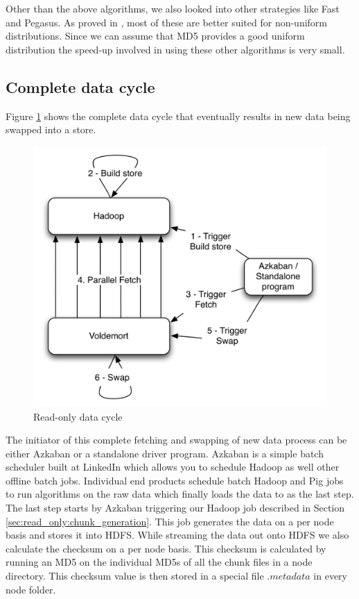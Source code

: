 \documentclass[10pt,twocolumn,preprint,nonatbib,numbers]{sigplanconf}
\begin{document}
Other than the above algorithms, we also looked into other strategies like Fast and Pegasus. As proved in \cite{manolopoulos}, most of these are better suited for non-uniform distributions. Since we can assume that MD5 provides a good uniform distribution the speed-up involved in using these other algorithms is very small. 


\subsection{Complete data cycle}
\label{sec:read_only:data_cycle}

Figure \ref{cycle} shows the complete data cycle that eventually results in new data being swapped into a \projectname{} store. 

\begin{figure}
  \centering
    \includegraphics[scale=0.60]{images/cycle.png}
  \caption{Read-only data cycle}
  \label{cycle}
\end{figure}

The initiator of this complete fetching and swapping of new data process can be either Azkaban or a standalone driver program. Azkaban\cite{azkaban} is a simple batch scheduler built at LinkedIn which allows you to schedule Hadoop as well other offline batch jobs. Individual end products schedule batch Hadoop and Pig jobs to run algorithms on the raw data which finally loads the data to \projectname{} as the last step. The last step starts by Azkaban triggering our Hadoop job described in Section \ref{sec:read_only:chunk_generation}. This job generates the data on a per node basis and stores it into HDFS. While streaming the data out onto HDFS we also calculate the checksum on a per node basis. This checksum is calculated by running an MD5 on the individual MD5s of all the chunk files in a node directory. This checksum value is then stored in a special file $.metadata$ in every node folder. 
\end{document}
